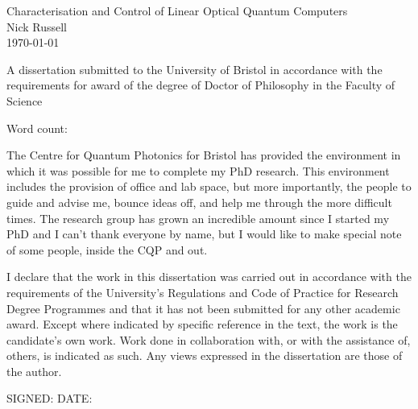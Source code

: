 \begin{titlepage}
  \begin{center}
    {\LARGE Characterisation and Control of Linear Optical Quantum Computers}
\\[1.5cm]
    {\Large Nick Russell}\\[1.5cm]
    {\today}\\[12.0cm]
  \end{center}
  \begin{flushleft}
    {A dissertation submitted to the University of Bristol in accordance with
    the requirements for award of the degree of Doctor of Philosophy in the
    Faculty of Science}
  \end{flushleft}
  \begin{flushright}
    Word count: 
  \end{flushright}
\end{titlepage}

\begin{abstract}
  Each copy must include an abstract or summary of the dissertation in not more
  than 300 words, on one side of A4, which should be single-spaced in a font
  size in the range 10 to 12.
\end{abstract}

\begin{acknowledgements}
  The Centre for Quantum Photonics for Bristol has provided the environment in
  which it was possible for me to complete my PhD research. This environment
  includes the provision of office and lab space, but more importantly, the
  people to guide and advise me, bounce ideas off, and help me through the more
  difficult times. The research group has grown an incredible amount since I
  started my PhD and I can't thank everyone by name, but I would like to make
  special note of some people, inside the CQP and out.
\end{acknowledgements}

\begin{declaration}
  I declare that the work in this dissertation was carried out in accordance
  with the requirements of the University's Regulations and Code of Practice for
  Research Degree Programmes and that it has not been submitted for any other
  academic award. Except where indicated by specific reference in the text, the
  work is the candidate's own work. Work done in collaboration with, or with the
  assistance of, others, is indicated as such. Any views expressed in the
  dissertation are those of the author.

  SIGNED: \dotfill DATE: \dotfill
\end{declaration}

\tableofcontents
\listoffigures

